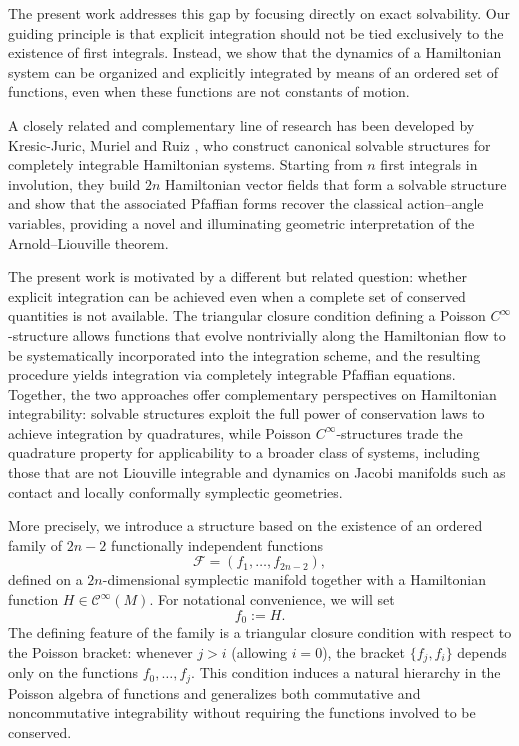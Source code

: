 \documentclass{article}
\theoremstyle{remark}
\theoremstyle{definition}
\begin{document}
The present work addresses this gap by focusing directly on exact solvability.
Our guiding principle is that explicit integration should not be tied
exclusively to the existence of first integrals. Instead, we show that the
dynamics of a Hamiltonian system can be organized and explicitly integrated by
means of an ordered set of functions, even when these functions are not
constants of motion.

A closely related and complementary line of research has been developed by Kresic-Juric, Muriel and Ruiz \cite{kresicjuric2025}, who construct canonical solvable structures for completely integrable Hamiltonian systems. Starting from $n$ first integrals in involution, they build $2n$ Hamiltonian vector fields that form a solvable structure and show that the associated Pfaffian forms recover the classical action--angle variables, providing a novel and illuminating geometric interpretation of the Arnold--Liouville theorem.

The present work is motivated by a different but related question: whether explicit integration can be achieved even when a complete set of conserved quantities is not available. The triangular closure condition defining a Poisson $C^\infty$-structure allows functions that evolve nontrivially along the Hamiltonian flow to be systematically incorporated into the integration scheme, and the resulting procedure yields integration via completely integrable Pfaffian equations. Together, the two approaches offer complementary perspectives on Hamiltonian integrability: solvable structures exploit the full power of conservation laws to achieve integration by quadratures, while Poisson $C^\infty$-structures trade the quadrature property for applicability to a broader class of systems, including those that are not Liouville integrable and dynamics on Jacobi manifolds such as contact and locally conformally symplectic geometries.

More precisely, we introduce a structure based on the existence of an ordered
family of $2n-2$ functionally independent functions
\[
\mathcal{F} = ( f_1, \dots, f_{2n-2} ),
\]
defined on a $2n$-dimensional symplectic manifold together with a Hamiltonian
function $H\in\mathcal C^\infty(M)$. For notational convenience, we will set
\[
 f_0:=H.
\]
The defining feature of the family is a triangular closure condition with
respect to the Poisson bracket: whenever $j>i$ (allowing $i=0$), the bracket
$\{f_j,f_i\}$ depends only on the functions $f_0,\dots,f_j$. This condition
induces a natural hierarchy in the Poisson algebra of functions and generalizes
both commutative and noncommutative integrability without requiring the
functions involved to be conserved.
\end{document}
